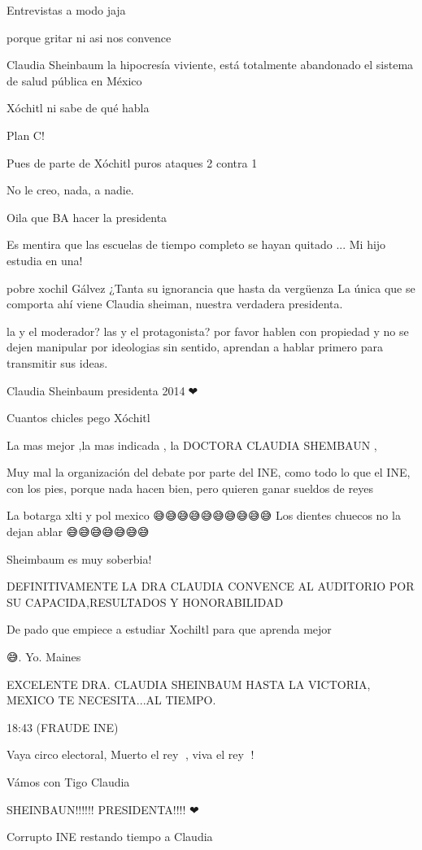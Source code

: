Entrevistas a modo jaja

porque gritar ni asi nos convence

Claudia Sheinbaum la hipocresía viviente, está totalmente abandonado el sistema de salud pública en México

Xóchitl ni sabe de qué habla

Plan C!

Pues de parte de Xóchitl puros ataques 2 contra 1

No le creo, nada, a nadie.

Oila que BA hacer la presidenta 🤡🤡🤡

Es mentira que las escuelas de tiempo completo se hayan quitado ... Mi hijo estudia en una!

pobre xochil Gálvez ¿Tanta su ignorancia que hasta da vergüenza La única que se comporta ahí viene Claudia sheiman, nuestra verdadera presidenta.

la y el moderador?   las y el protagonista? por favor hablen con propiedad y no se dejen manipular por ideologias sin sentido, aprendan a hablar primero para transmitir sus ideas.

Claudia Sheinbaum presidenta 2014🎉❤

Cuantos chicles pego Xóchitl

La mas mejor ,la mas indicada , la DOCTORA  CLAUDIA SHEMBAUN ,

Muy mal la organización del debate por parte del INE, como todo lo que  el INE, con los pies, porque nada hacen bien, pero quieren ganar sueldos de reyes

La botarga xlti y pol mexico 😅😅😅😅😅😅😅😅😅😅 Los dientes chuecos no la dejan ablar 😅😅😅😅😅😅😅

Sheimbaum es muy soberbia!

DEFINITIVAMENTE LA DRA CLAUDIA CONVENCE AL AUDITORIO POR SU CAPACIDA,RESULTADOS Y HONORABILIDAD

De pado que empiece a estudiar Xochiltl para que aprenda mejor

😅.     Yo.    Maines

EXCELENTE DRA. CLAUDIA SHEINBAUM HASTA LA VICTORIA, MEXICO TE NECESITA...AL TIEMPO.

18:43 (FRAUDE INE)

Vaya circo electoral, Muerto el rey 👑, viva el rey 👑!

Vámos con Tigo Claudia

SHEINBAUN!!!!!! PRESIDENTA!!!! ❤

Corrupto INE restando tiempo a Claudia

